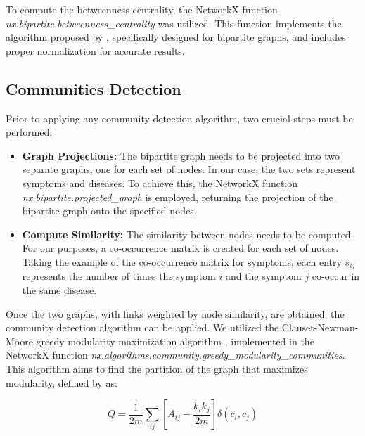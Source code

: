 To compute the betweenness centrality, the NetworkX function \textit{nx.bipartite.betweenness\_centrality}
was utilized. This function implements the algorithm proposed by  \cite{Brandes_2004},
specifically designed for bipartite graphs, and includes proper normalization for accurate results.

\subsection{Communities Detection}
Prior to applying any community detection algorithm, two crucial steps must be performed:


\begin{itemize}
  \setlength\itemsep{1em} %
  \item \textbf{Graph Projections:} The bipartite graph needs to be projected into two separate graphs,
        one for each set of nodes. In our case, the two sets represent symptoms and diseases. To achieve this,
        the NetworkX function \textit{nx.bipartite.projected\_graph} is employed, returning the projection of
        the bipartite graph onto the specified nodes.

  \item \textbf{Compute Similarity:} The similarity between nodes needs to be computed. For our purposes,
        a co-occurrence matrix is created for each set of nodes. Taking the example of the co-occurrence matrix
        for symptoms, each entry \(s_{ij}\) represents the number of times the symptom \(i\) and the symptom \(j\)
        co-occur in the same disease.
\end{itemize}

Once the two graphs, with links weighted by node similarity, are obtained, the community detection algorithm
can be applied. We utilized the Clauset-Newman-Moore greedy modularity maximization algorithm \cite{Clauset_Newman_Moore_2004},
implemented in the NetworkX function \textit{nx.algorithms.community.greedy\_modularity\_communities}. This algorithm aims to
find the partition of the graph that maximizes modularity, defined by  \cite{Newman_2006} as:

\begin{equation}
  Q = \frac{1}{2m} \sum_{ij} \left[A_{ij} - \frac{k_i k_j}{2m}\right] \delta(c_i, c_j) \label{eq:modularity}
\end{equation}

